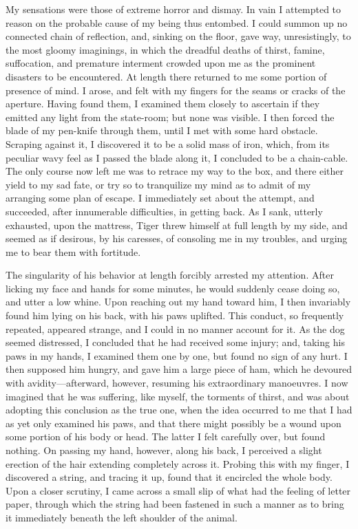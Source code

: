 My sensations were those of extreme horror and dismay. In vain I attempted to
reason on the probable cause of my being thus entombed. I could summon up no
connected chain of reflection, and, sinking on the floor, gave way,
unresistingly, to the most gloomy imaginings, in which the dreadful deaths of
thirst, famine, suffocation, and premature interment crowded upon me as the
prominent disasters to be encountered. At length there returned to me some
portion of presence of mind. I arose, and felt with my fingers for the seams or
cracks of the aperture. Having found them, I examined them closely to ascertain
if they emitted any light from the state-room; but none was visible. I then
forced the blade of my pen-knife through them, until I met with some hard
obstacle. Scraping against it, I discovered it to be a solid mass of iron,
which, from its peculiar wavy feel as I passed the blade along it, I concluded
to be a chain-cable. The only course now left me was to retrace my way to the
box, and there either yield to my sad fate, or try so to tranquilize my mind as
to admit of my arranging some plan of escape. I immediately set about the
attempt, and succeeded, after innumerable difficulties, in getting back. As I
sank, utterly exhausted, upon the mattress, Tiger threw himself at full length
by my side, and seemed as if desirous, by his caresses, of consoling me in my
troubles, and urging me to bear them with fortitude. 

The singularity of his behavior at length forcibly arrested my attention.
After licking my face and hands for some minutes, he would suddenly cease doing
so, and utter a low whine. Upon reaching out my hand toward him, I then
invariably found him lying on his back, with his paws uplifted. This conduct, so
frequently repeated, appeared strange, and I could in no manner account for it.
As the dog seemed distressed, I concluded that he had received some injury; and,
taking his paws in my hands, I examined them one by one, but found no sign of
any hurt. I then supposed him hungry, and gave him a large piece of ham, which
he devoured with avidity---afterward, however, resuming his extraordinary
manoeuvres. I now imagined that he was suffering, like myself, the torments of
thirst, and was about adopting this conclusion as the true one, when the idea
occurred to me that I had as yet only examined his paws, and that there might
possibly be a wound upon some portion of his body or head. The latter I felt
carefully over, but found nothing. On passing my hand, however, along his back,
I perceived a slight erection of the hair extending completely across it.
Probing this with my finger, I discovered a string, and tracing it up, found
that it encircled the whole body. Upon a closer scrutiny, I came across a small
slip of what had the feeling of letter paper, through which the string had been
fastened in such a manner as to bring it immediately beneath the left shoulder
of the animal. 


